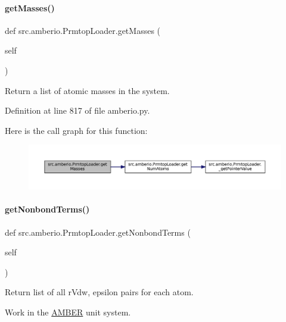 \paragraph{\texorpdfstring{get\+Masses()}{getMasses()}}
{\footnotesize\ttfamily def src.\+amberio.\+Prmtop\+Loader.\+get\+Masses (\begin{DoxyParamCaption}\item[{}]{self }\end{DoxyParamCaption})}



Return a list of atomic masses in the system. 



Definition at line 817 of file amberio.\+py.

Here is the call graph for this function\+:
\nopagebreak
\begin{figure}[H]
\begin{center}
\leavevmode
\includegraphics[width=350pt]{classsrc_1_1amberio_1_1PrmtopLoader_a5692d84029e2fd6395a6438b1ae20437_cgraph}
\end{center}
\end{figure}
\mbox{\label{classsrc_1_1amberio_1_1PrmtopLoader_a23d0b10c76fb39e206cf6841ff6f56ce}} 
\paragraph{\texorpdfstring{get\+Nonbond\+Terms()}{getNonbondTerms()}}
{\footnotesize\ttfamily def src.\+amberio.\+Prmtop\+Loader.\+get\+Nonbond\+Terms (\begin{DoxyParamCaption}\item[{}]{self }\end{DoxyParamCaption})}



Return list of all r\+Vdw, epsilon pairs for each atom. 

Work in the \hyperlink{classsrc_1_1amberio_1_1AMBER}{A\+M\+B\+ER} unit system. 

